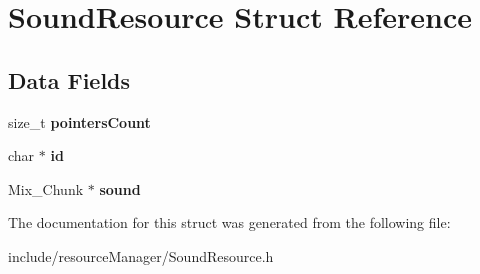 \hypertarget{struct_sound_resource}{}\section{Sound\+Resource Struct Reference}
\label{struct_sound_resource}
\subsection*{Data Fields}
\begin{DoxyCompactItemize}
\item 
\hypertarget{struct_sound_resource_aa058e87a17f5f5079be31c1631ed5f50}{}\label{struct_sound_resource_aa058e87a17f5f5079be31c1631ed5f50} 
size\+\_\+t {\bfseries pointers\+Count}
\item 
\hypertarget{struct_sound_resource_aecb3b0d045ada529257a2fbf8f829599}{}\label{struct_sound_resource_aecb3b0d045ada529257a2fbf8f829599} 
char $\ast$ {\bfseries id}
\item 
\hypertarget{struct_sound_resource_a0bb45d52afdd032f48e17a8519361d54}{}\label{struct_sound_resource_a0bb45d52afdd032f48e17a8519361d54} 
Mix\+\_\+\+Chunk $\ast$ {\bfseries sound}
\end{DoxyCompactItemize}


The documentation for this struct was generated from the following file\+:\begin{DoxyCompactItemize}
\item 
include/resource\+Manager/Sound\+Resource.\+h\end{DoxyCompactItemize}
